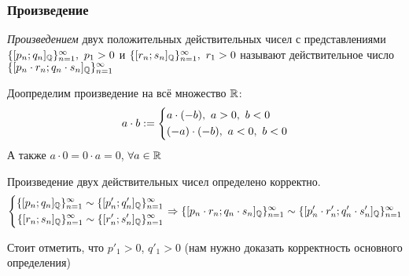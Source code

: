 \subsubsection*{Произведение}

\begin{definition}
    \textit{Произведением} двух положительных действительных чисел с представлениями $\{[p_n;q_n]_{\mathbb{Q}}\}_{n = 1}^\infty,\ p_1 > 0$ и $\{[r_n;s_n]_{\mathbb{Q}}\}_{n = 1}^\infty,\ r_1 > 0$ называют действительное число $\{[p_n \cdot r_n;q_n \cdot s_n]_{\mathbb{Q}}\}_{n = 1}^\infty$
\end{definition}

Доопределим произведение на всё множество $\mathbb{R}$:
\[
	a \cdot b := \left\{\begin{aligned}
		&{a \cdot (-b),\ a > 0,\ b < 0}
		\\
		&{(-a) \cdot (-b),\ a < 0,\ b < 0}
	\end{aligned}\right.
\]
А также $a \cdot 0 = 0 \cdot a = 0$, $\forall a \in \mathbb{R}$

\begin{proposition}
    Произведение двух действительных чисел определено корректно.
    $$
        \left\{\begin{aligned}\{[p_n; q_n]_{\mathbb{Q}}\}_{n = 1}^\infty \sim \{[p'_n; q'_n]_{\mathbb{Q}}\}_{n = 1}^\infty \\ 
            \{[r_n; s_n]_{\mathbb{Q}}\}_{n = 1}^\infty \sim \{[r'_n; s'_n]_{\mathbb{Q}}\}_{n = 1}^\infty\end{aligned}\right.
    \Rightarrow
    \{[p_n \cdot r_n; q_n \cdot s_n]_{\mathbb{Q}}\}_{n = 1}^\infty \sim \{[p'_n \cdot r'_n; q'_n \cdot s'_n]_{\mathbb{Q}}\}_{n = 1}^\infty
    $$
\end{proposition}

\begin{anote}
    Стоит отметить, что $p'_1 > 0$, $q'_1 > 0$ (нам нужно доказать корректность основного определения)
\end{anote}

